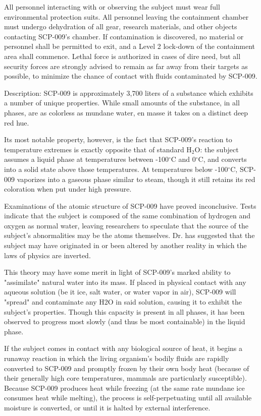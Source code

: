 \documentclass[a4paper, 11pt]{article}
\newcommand{\degree}{$^{\circ}$}
\begin{document}
All personnel interacting with or observing the subject must wear full environmental protection suits. All personnel leaving the containment chamber must undergo dehydration of all gear, research materials, and other objects contacting SCP-009's chamber. If contamination is discovered, no material or personnel shall be permitted to exit, and a Level 2 lock-down of the containment area shall commence. Lethal force is authorized in cases of dire need, but all security forces are strongly advised to remain as far away from their targets as possible, to minimize the chance of contact with fluids contaminated by SCP-009.

Description: SCP-009 is approximately 3,700 liters of a substance which exhibits a number of unique properties. While small amounts of the substance, in all phases, are as colorless as mundane water, en masse it takes on a distinct deep red hue.

Its most notable property, however, is the fact that SCP-009's reaction to temperature extremes is exactly opposite that of standard H$_{2}$O: the subject assumes a liquid phase at temperatures between -100\degree C and 0\degree C, and converts into a solid state above those temperatures. At temperatures below -100\degree C, SCP-009 vaporizes into a gaseous phase similar to steam, though it still retains its red coloration when put under high pressure.

Examinations of the atomic structure of SCP-009 have proved inconclusive. Tests indicate that the subject is composed of the same combination of hydrogen and oxygen as normal water, leaving researchers to speculate that the source of the subject's abnormalities may be the atoms themselves. Dr.  has suggested that the subject may have originated in or been altered by another reality in which the laws of physics are inverted.

This theory may have some merit in light of SCP-009's marked ability to "assimilate" natural water into its mass. If placed in physical contact with any aqueous solution (be it ice, salt water, or water vapor in air), SCP-009 will "spread" and contaminate any H2O in said solution, causing it to exhibit the subject's properties. Though this capacity is present in all phases, it has been observed to progress most slowly (and thus be most containable) in the liquid phase.

If the subject comes in contact with any biological source of heat, it begins a runaway reaction in which the living organism's bodily fluids are rapidly converted to SCP-009 and promptly frozen by their own body heat (because of their generally high core temperatures, mammals are particularly susceptible). Because SCP-009 produces heat while freezing (at the same rate mundane ice consumes heat while melting), the process is self-perpetuating until all available moisture is converted, or until it is halted by external interference.
\end{document}
